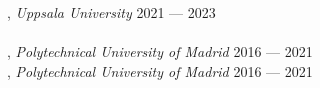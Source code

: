 , \textit{Uppsala University}	\hfill 2021 --- 2023 \\

\skills{} \textit{}	\hfill \\

, \textit{Polytechnical University of Madrid} \hfill	2016 --- 2021 \\
, \textit{Polytechnical University of Madrid} \hfill	2016 --- 2021 \\


